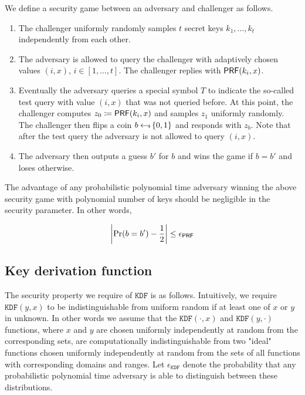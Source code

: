 \documentclass{article}
\begin{document}
We define a security game between an adversary and challenger as follows.

\begin{enumerate}
\item The challenger uniformly randomly samples $t$ secret keys $k_1,\ldots,k_t$ independently from each other.

\item The adversary is allowed to query the challenger with adaptively chosen values $(i,x)$, $i \in [1,\ldots,t]$. The challenger replies with $\mathsf{PRF}(k_i, x)$.

\item Eventually the adversary queries a special symbol $T$ to indicate the so-called test query with value $(i,x)$ that was not queried before. At this point, the challenger computes $z_0 \coloneqq \mathsf{PRF}(k_i, x)$ and samples $z_1$ uniformly randomly. The challenger then flips a coin $b \hskip2.3pt{\gets\!\!\mbox{\tiny${\$}$\normalsize}}\, \{0, 1\}$ and responds with $z_b$. Note that after the test query the adversary is not allowed to query $(i,x)$.

\item The adversary then outputs a guess $b'$ for $b$ and wins the game if $b = b'$ and loses otherwise.
\end{enumerate}

The advantage of any probabilistic polynomial time adversary winning the above security game with polynomial number of keys should be negligible in the security parameter. In other words,

$$
\left \vert \Pr(b = b') - \frac{1}{2} \right \vert \le \epsilon_{\mathsf{PRF}}
$$

\subsection{Key derivation function} \label{KDFdef}
The security property we require of $\texttt{KDF}$ is as follows. Intuitively, we require $\texttt{KDF}(y,x)$ to be indistinguishable from uniform random if at least one of $x$ or $y$ in unknown. In other words we assume that the $\texttt{KDF}(\cdot,x)$ and $\texttt{KDF}(y,\cdot)$ functions, where $x$ and $y$ are chosen uniformly independently at random from the corresponding sets, are computationally indistinguishable from two "ideal" functions chosen uniformly independently at random from the sets of all functions with corresponding domains and ranges.  Let $\epsilon_{\texttt{KDF}}$ denote the probability that any probabilistic polynomial time adversary is able to distinguish between these distributions.
\end{document}
